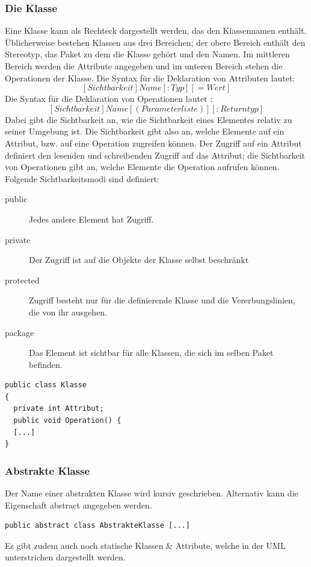 \documentclass[a4paper,10pt,DIV9, BCOR12mm, oneside,openright,openbib]{scrreprt}
\theoremstyle{definition}
\theoremstyle{plain}
\begin{document}
\subsubsection{Die Klasse}
Eine Klasse kann als Rechteck dargestellt werden, das den Klassennamen enthält. Üblicherweise bestehen Klassen aus drei Bereichen; der obere Bereich enthält den Stereotyp, das Paket zu dem die Klasse gehört und den Namen. Im mittleren Bereich werden die Attribute angegeben und im unteren Bereich stehen die Operationen der Klasse.
Die Syntax für die Deklaration von Attributen lautet: \[[Sichtbarkeit] Name [:Typ] [=Wert]\]
Die Syntax für die Deklaration von Operationen lautet :  \[[Sichtbarkeit] Name [(Parameterliste)] [: Returntyp]\] 
Dabei gibt die Sichtbarkeit an, wie die Sichtbarkeit eines Elementes relativ zu seiner Umgebung ist. Die Sichtbarkeit gibt also an,  welche Elemente auf ein Attribut, bzw. auf eine Operation zugreifen können. Der Zugriff auf ein Attribut definiert den lesenden und schreibenden Zugriff auf das Attribut; die Sichtbarkeit von Operationen gibt an,   welche   Elemente   die   Operation   aufrufen   können.   Folgende Sichtbarkeitsmodi sind definiert:
\begin{description}
 \item[public] Jedes andere Element hat Zugriff.
 \item[private] Der Zugriff ist auf die Objekte der Klasse selbst beschränkt
 \item[protected] Zugriff besteht nur für die definierende Klasse und die Vererbungslinien, die von ihr ausgehen.
 \item[package] Das Element ist sichtbar für alle Klassen, die sich im selben Paket befinden.
\end{description}
\begin{lstlisting}[caption=Implementierung Klasse]
public class Klasse
{
  private int Attribut;
  public void Operation() {
  [...]
}
\end{lstlisting}

\subsubsection{Abstrakte Klasse}
Der Name einer abstrakten Klasse wird kursiv geschrieben. Alternativ kann die Eigenschaft {abstract} angegeben werden.
\begin{lstlisting}[caption=Implementierung abstrakte Klasse]
public abstract class AbstrakteKlasse [...]
\end{lstlisting}
Es gibt zudem auch noch statische Klassen \& Attribute, welche in der UML unterstrichen dargestellt werden.
\end{document}
